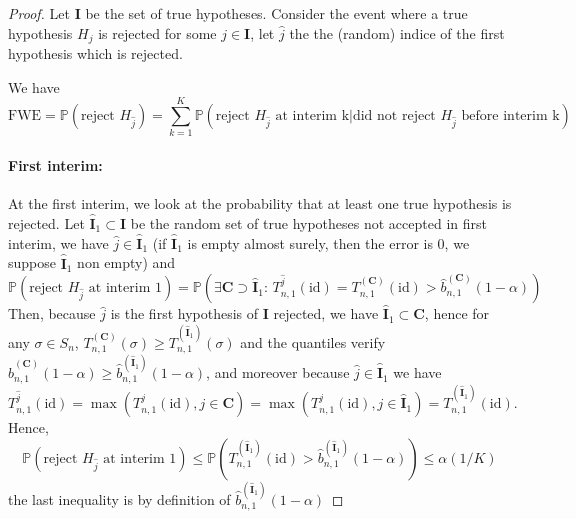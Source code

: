 \documentclass{article}
\theoremstyle{plain}
\theoremstyle{remark}
\renewcommand{\P}{\mathbb{P}}
\newcommand{\1}{\mathbbm{1}}
\newcommand{\id}{\mathrm{id}}
\numberwithin{equation}{section}
\begin{document}
\begin{proof}
Let $\textbf{I}$ be the set of true hypotheses. Consider the event where a true hypothesis $H_j$ is rejected for some $j \in \textbf{I}$, let $\widehat{j}$ the the (random) indice of the first hypothesis which is rejected.

We have 
\begin{equation}\label{eq:multi1}
\mathrm{FWE} = \P\left(\text{reject }H_{\widehat{j}} \right)= \sum_{k=1}^K \P\left(\text{reject }H_{\widehat{j}} \text{ at interim k} \Big| \text{did not reject }H_{\widehat{j}} \text{ before interim k} \right) 
\end{equation}


\paragraph{First interim:}

At the first interim, we look at the probability that at least one true hypothesis is rejected. Let $\widehat{\textbf{I}}_1 \subset \textbf{I}$ be the random set of true hypotheses not accepted in first interim, we have $\widehat{j}\in \widehat{\textbf{I}}_1$ (if $\widehat{\textbf{I}}_1$ is empty almost surely, then the error is $0$, we suppose $\widehat{\textbf{I}}_1$ non empty) and
$$\P\left(\text{reject }H_{\widehat{j}} \text{ at interim 1}\right)= \P\left( \exists \textbf{C}\supset \widehat{\textbf{I}}_1: \, T_{n,1}^{\widehat{j}}(\id) = T_{n,1}^{(\textbf{C})}(\id) > \widehat{b}_{n,1}^{(\textbf{C})}(1-\alpha) \right) $$
Then, because $\widehat{j}$ is the first hypothesis of $\textbf{I}$ rejected, we have $\widehat{\textbf{I}}_1 \subset \textbf{C}$, hence for any $\sigma \in S_n$, $ T_{n,1}^{(\textbf{C})}(\sigma)\ge T_{n,1}^{(\widehat{\textbf{I}}_1)}(\sigma)$ and the quantiles verify $ \widehat{b}_{n,1}^{(\textbf{C})}(1-\alpha) \ge \widehat{b}_{n,1}^{(\widehat{\textbf{I}}_1)}(1-\alpha)$,
 and moreover because $\widehat{j} \in \widehat{\textbf{I}}_1$ we have
$$T_{n,1}^{\widehat{j}}(\id)=\max(T_{n,1}^{j}(\id), j \in  \textbf{C}) = \max(T_{n,1}^{j}(\id), j \in  \widehat{\textbf{I}}_1) = T_{n,1}^{(\widehat{\textbf{I}}_1)}(\id).$$
Hence,
\begin{equation}\label{eq:interim1_multi}
\P\left(\text{reject }H_{\widehat{j}} \text{ at interim 1}\right)\le \P\left( T_{n,1}^{(\widehat{\textbf{I}}_1)}(\id) > \widehat{b}_{n,1}^{(\widehat{\textbf{I}}_1)}(1-\alpha) \right) \le  \alpha(1/K) 
\end{equation}
the last inequality is by definition of $\widehat{b}_{n,1}^{(\widehat{\textbf{I}}_1)}(1-\alpha)$


\end{proof}
\end{document}

